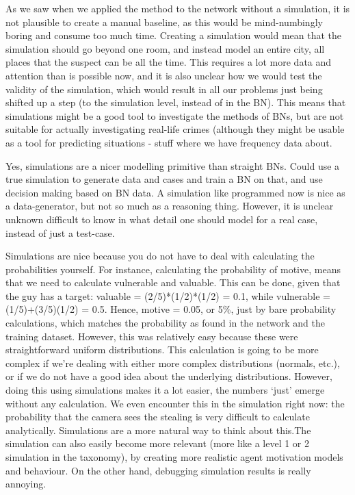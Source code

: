 \documentclass[12pt]{article}
\begin{document}
\begin{enumerate}
As we saw when we applied the method to the network without a simulation, it is not plausible to create a manual baseline, as this would be mind-numbingly boring and consume too much time.  Creating a simulation would mean that the simulation should go beyond one room, and instead model an entire city, all places that the suspect can be all the time. This requires a lot more data and attention than is possible now, and it is also unclear how we would test the validity of the simulation, which would result in all our problems just being shifted up a step (to the simulation level, instead of in the BN). This means that simulations might be a good tool to investigate the methods of BNs, but are not suitable for actually investigating real-life crimes (although they might be usable as a tool for predicting situations - stuff where we have frequency data about.

Yes, simulations are a nicer modelling primitive than straight BNs. Could use a true simulation to generate data and cases and train a BN on that, and use decision making based on BN data. A simulation like programmed now is nice as a data-generator, but not so much as a reasoning thing. However, it is unclear unknown difficult to know in what detail one should model for a real case, instead of just a test-case.

Simulations are nice because you do not have to deal with calculating the probabilities yourself. For instance, calculating the probability of motive, means that we need to calculate vulnerable and valuable. This can be done, given that the guy has a target: valuable = (2/5)*(1/2)*(1/2) = 0.1, while vulnerable = (1/5)+(3/5)(1/2) = 0.5. Hence, motive = 0.05, or 5\%, just by bare probability calculations, which matches the probability as found in the network and the training dataset. However, this was relatively easy because these were straightforward uniform distributions. This calculation is going to be more complex if we're dealing with either more complex distributions (normals, etc.), or if we do not have a good idea about the underlying distributions. However, doing this using simulations makes it a lot easier, the numbers `just' emerge without any calculation. We even encounter this in the simulation right now: the probability that the camera sees the stealing is very difficult to calculate analytically. Simulations are a more natural way to think about this.The simulation can also easily become more relevant (more like a level 1 or 2 simulation in the taxonomy), by creating more realistic agent motivation models and behaviour. On the other hand, debugging simulation results is really annoying.


\end{enumerate}
\end{document}
